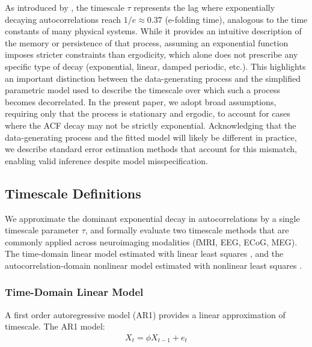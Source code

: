 \documentclass[main.tex]{subfiles}
\begin{document}
As introduced by \citet{murray_hierarchy_2014}, the timescale $\tau$ represents the lag where exponentially decaying autocorrelations reach $1/e \approx 0.37$ (e-folding time), analogous to the time constants of many physical systems. While it provides an intuitive description of the memory or persistence of that process, assuming an exponential function imposes stricter constraints than ergodicity, which alone does not prescribe any specific type of decay (exponential, linear, damped periodic, etc.). This highlights an important distinction between the data-generating process and the simplified parametric model used to describe the timescale over which such a process becomes decorrelated. In the present paper, we adopt broad assumptions, requiring only that the process is stationary and ergodic, to account for cases where the ACF decay may not be strictly exponential. Acknowledging that the data-generating process and the fitted model will likely be different in practice, we describe standard error estimation methods that account for this mismatch, enabling valid inference despite model misspecification.

\subsection{Timescale Definitions}
We approximate the dominant exponential decay in autocorrelations by a single timescale parameter $\tau$, and formally evaluate two timescale methods that are commonly applied across neuroimaging modalities (fMRI, EEG, ECoG, MEG). The time-domain linear model estimated with linear least squares \citep{kaneoke_variance_2012, meisel_decline_2017, huang_timescales_2018, lurie_cortical_2024, shinn_functional_2023, shafiei_topographic_2020}, and the autocorrelation-domain nonlinear model estimated with nonlinear least squares \citep{rossi-pool_invariant_2021, cirillo_neural_2018, ito_cortical_2020, runyan_distinct_2017, zeraati_flexible_2022, nougaret_intrinsic_2021, wasmuht_intrinsic_2018, muller_core_2020, maisson_choice-relevant_2021, li_hierarchical_2022, shafiei_topographic_2020}.


\subsubsection{Time-Domain Linear Model}\label{sec:time-domain-linear-model}
A first order autoregressive model (AR1) provides a linear approximation of timescale. The AR1 model:
\begin{align}\label{eq:ar1}
    X_t = \phi X_{t-1} + e_t
\end{align}
\end{document}
